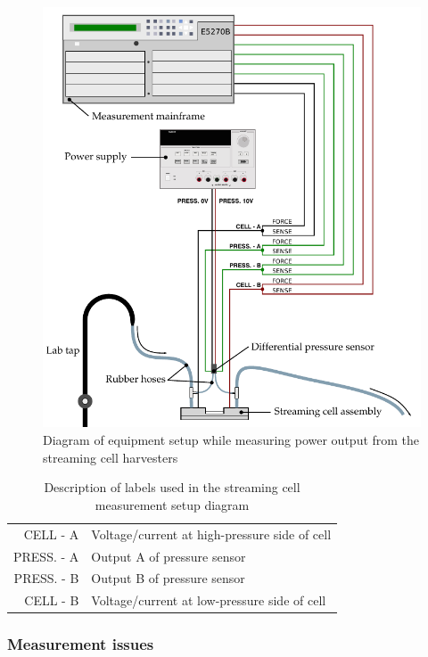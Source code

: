     \begin{figure}
        \includegraphics{content/pt1/01-PowerHarvesting/graphics/measurementSetup}
        \caption{\label{fig:measurementSetup}Diagram of equipment setup while measuring power output from the streaming cell harvesters}
    \end{figure}

    \begin{table}
        \centering
        \begin{tabular}{r|l}
        CELL - A & Voltage/current at high-pressure side of cell\\
        PRESS. - A & Output A of pressure sensor\\
        PRESS. - B & Output B of pressure sensor\\
        CELL - B & Voltage/current at low-pressure side of cell
        \end{tabular}
        \caption{\label{tab:measurementSetup_legend}Description of labels used in the streaming cell measurement setup diagram}
    \end{table}

    \subsubsection*{Measurement issues}

